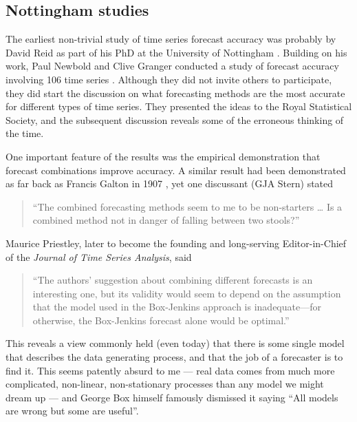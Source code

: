 \documentclass[11pt,a4paper,]{article}
\begin{document}
\hypertarget{nottingham-studies}{%
\subsection*{Nottingham studies}\label{nottingham-studies}}

The earliest non-trivial study of time series forecast accuracy was probably by David Reid as part of his PhD at the University of Nottingham \autocite{reidphd}. Building on his work, Paul Newbold and Clive Granger conducted a study of forecast accuracy involving 106 time series \autocite{NewboldGranger74}. Although they did not invite others to participate, they did start the discussion on what forecasting methods are the most accurate for different types of time series. They presented the ideas to the Royal Statistical Society, and the subsequent discussion reveals some of the erroneous thinking of the time.

One important feature of the results was the empirical demonstration that forecast combinations improve accuracy. A similar result had been demonstrated as far back as Francis Galton in 1907 \autocite{Wallis2014}, yet one discussant (GJA Stern) stated

\begin{quote}
``The combined forecasting methods seem to me to be non-starters \ldots{} Is a combined method not in danger of falling between two stools?''
\end{quote}

Maurice Priestley, later to become the founding and long-serving Editor-in-Chief of the \emph{Journal of Time Series Analysis}, said

\begin{quote}
``The authors' suggestion about combining different forecasts is an interesting one, but its validity would seem to depend on the assumption that the model used in the Box-Jenkins approach is inadequate---for otherwise, the Box-Jenkins forecast alone would be optimal.''
\end{quote}

This reveals a view commonly held (even today) that there is some single model that describes the data generating process, and that the job of a forecaster is to find it. This seems patently absurd to me --- real data comes from much more complicated, non-linear, non-stationary processes than any model we might dream up --- and George Box himself famously dismissed it saying ``All models are wrong but some are useful''.
\end{document}
